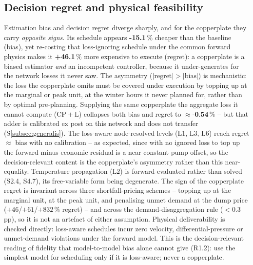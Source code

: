 \documentclass[a4paper,fleqn]{cas-dc}
\newcommand{\CPL}{\ensuremath{\mathrm{CP{+}L}}} %
\newcommand{\Lone}{\ensuremath{\mathrm{L1}}}    %
\newcommand{\Ltwo}{\ensuremath{\mathrm{L2}}}    %
\newcommand{\Lthree}{\ensuremath{\mathrm{L3}}}  %
\newcommand{\Lsix}{\ensuremath{\mathrm{L6}}}    %
\begin{document}
\subsection{Decision regret and physical feasibility}
Estimation bias and decision regret diverge sharply, and for the copperplate they
carry \emph{opposite signs}. Its schedule appears \textbf{-15.1}\,\% cheaper
than the baseline (bias), yet re-costing that loss-ignoring schedule under the common
forward physics makes it \textbf{+46.1}\,\% more expensive to execute
(regret): a copperplate is a biased estimator \emph{and} an incompetent controller,
because it under-generates for the network losses it never saw. The asymmetry
($|\text{regret}|>|\text{bias}|$) is mechanistic: the loss the copperplate omits must
be covered under execution by topping up at the marginal or peak unit, at the winter
hours it never planned for, rather than by optimal pre-planning. Supplying the same
copperplate the aggregate loss it cannot compute (\CPL) collapses both bias and regret
to $\approx\textbf{-0.54}\,\%$ -- but that adder is calibrated ex post on this
network and does not transfer (S\ref{subsec:generalis}). The loss-aware node-resolved levels
(\Lone, \Lthree, \Lsix) reach regret $\approx$ bias with no calibration -- as expected, since with
no ignored loss to top up the forward-minus-economic residual is a near-constant pump offset, so
the decision-relevant content is the copperplate's asymmetry rather than this near-equality.
Temperature propagation (\Ltwo) is forward-evaluated rather than solved (S2.4, S4.7), its
free-variable form being degenerate. The sign of the
copperplate regret is invariant across three shortfall-pricing schemes -- topping up at
the marginal unit, at the peak unit, and penalising unmet demand at the dump price
($+46$/$+61$/$+832$\,\% regret) -- and across the demand-disaggregation rule
($<0.3$\,pp), so it is not an artefact of either assumption. Physical deliverability is
checked directly: loss-aware schedules incur zero velocity, differential-pressure or
unmet-demand violations under the forward model. This is the decision-relevant reading of
fidelity that model-to-model bias alone cannot give (R1.2): use the simplest model for
scheduling only if it is loss-aware; never a copperplate.

\end{document}

